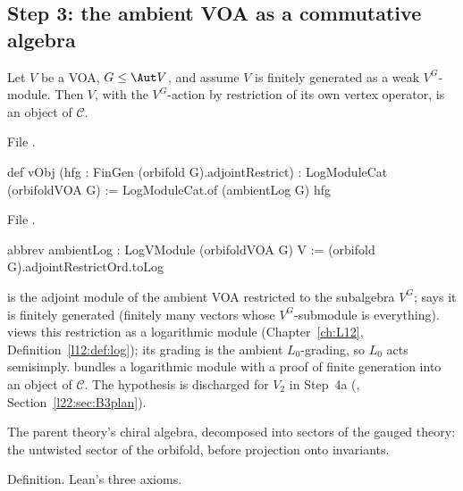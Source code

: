 \subsection{Step 3: the ambient VOA as a commutative algebra}

\begin{definition}\label{l22:def:vObj}
Let $V$ be a VOA, $G\le\Aut V$, and assume $V$ is finitely generated as a weak $V^G$-module. Then $V$, with the
$V^G$-action by restriction of its own vertex operator, is an object of $\mathcal C$.
\end{definition}
\noindent File .
\begin{leancode}
def vObj (hfg : FinGen (orbifold G).adjointRestrict) : LogModuleCat (orbifoldVOA G) :=
  LogModuleCat.of (ambientLog G) hfg
\end{leancode}
\noindent File .
\begin{leancode}
abbrev ambientLog : LogVModule (orbifoldVOA G) V := (orbifold G).adjointRestrictOrd.toLog
\end{leancode}

\begin{dictionary}
 is the adjoint module of the ambient VOA restricted to the subalgebra $V^G$;
 says it is finitely generated (finitely many vectors whose $V^G$-submodule is everything).
 views this restriction as a logarithmic module (Chapter~\ref{ch:L12}, Definition~\ref{l12:def:log});
its grading is the ambient $L_0$-grading, so $L_0$ acts semisimply.  bundles a logarithmic module
with a proof of finite generation into an object of $\mathcal C$. The hypothesis  is discharged for $V_2$ in
Step~4a (, Section~\ref{l22:sec:B3plan}).
\end{dictionary}

\begin{physics}
The parent theory's chiral algebra, decomposed into sectors of the gauged theory: the untwisted sector of the
orbifold, before projection onto invariants.
\end{physics}

\begin{status}
Definition. Lean's three axioms.
\end{status}

